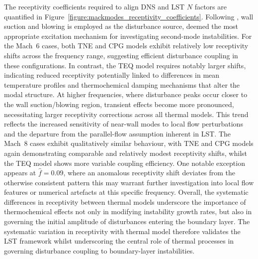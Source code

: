 The receptivity coefficients required to align \gls{DNS} and \gls{LST} $N$ factors are quantified in Figure~\ref{figure:mackmodes_receptivity_coefficients}. Following \citet{DeTullio2013}, wall suction and blowing is employed as the disturbance source, deemed the most appropriate excitation mechanism for investigating second-mode instabilities. For the Mach~6 cases, both \gls{TNE} and \gls{CPG} models exhibit relatively low receptivity shifts across the frequency range, suggesting efficient disturbance coupling in these configurations. In contrast, the \gls{TEQ} model requires notably larger shifts, indicating reduced receptivity potentially linked to differences in mean temperature profiles and thermochemical damping mechanisms that alter the modal structure. At higher frequencies, where disturbance peaks occur closer to the wall suction/blowing region, transient effects become more pronounced, necessitating larger receptivity corrections across all thermal models. This trend reflects the increased sensitivity of near-wall modes to local flow perturbations and the departure from the parallel-flow assumption inherent in \gls{LST}. The Mach~8 cases exhibit qualitatively similar behaviour, with \gls{TNE} and \gls{CPG} models again demonstrating comparable and relatively modest receptivity shifts, whilst the \gls{TEQ} model shows more variable coupling efficiency. One notable exception appears at $\hat f = 0.09$, where an anomalous receptivity shift deviates from the otherwise consistent pattern this may warrant further investigation into local flow features or numerical artefacts at this specific frequency. Overall, the systematic differences in receptivity between thermal models underscore the importance of thermochemical effects not only in modifying instability growth rates, but also in governing the initial amplitude of disturbances entering the boundary layer. The systematic variation in receptivity with thermal model therefore validates the \gls{LST} framework whilst underscoring the central role of thermal processes in governing disturbance coupling to boundary-layer instabilities.





